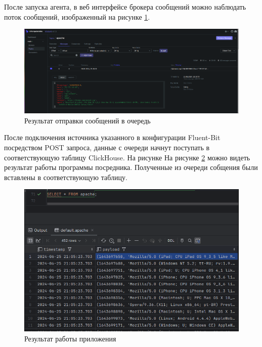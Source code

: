 \documentclass[14pt, russian]{scrartcl}
\begin{document}
После запуска агента, в веб интерфейсе
брокера сообщений можно наблюдать поток
сообщений, изображенный на рисунке \ref{fig:fluentmsgs}.

\begin{figure}[H]
	\centering
	\begin{minipage}[t]{.9\textwidth}
		\centering
		\includegraphics[width=.9\textwidth]{./imgs/msgs.png}
	\end{minipage}
	\caption{Результат отправки сообщений в очередь}
	\label{fig:fluentmsgs}
\end{figure}


После подключения источника указанного в конфигурации
Fluent-Bit посредством POST запроса, данные с очереди начнут 
поступать в соответствующую таблицу ClickHouse. На рисунке
На рисунке \ref{fig:inserterresult} можно видеть результат работы программы 
посредника. Полученные из очереди собщения были вставлены в соответствующую таблицу.
 
\begin{figure}[H]
	\centering
	\begin{minipage}[t]{.9\textwidth}
		\centering
		\includegraphics[width=.9\textwidth]{./imgs/inserterresult.png}
	\end{minipage}
	\caption{Результат работы приложения}
	\label{fig:inserterresult}
\end{figure}
\end{document}
